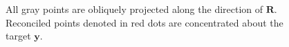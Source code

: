 \documentclass[12pt]{article}
\theoremstyle{definition}
\theoremstyle{property}
\begin{document}
	
	\begin{figure}[H] 
	\centering
	\small
	\caption{All gray points are obliquely projected along the direction of $\bm{R}$. Reconciled points denoted in red dots are concentrated about the target $\bm{y}$.}\label{fig:Oblique_projection_all_points}
	\end{figure}
	
%			
	
\end{document}
